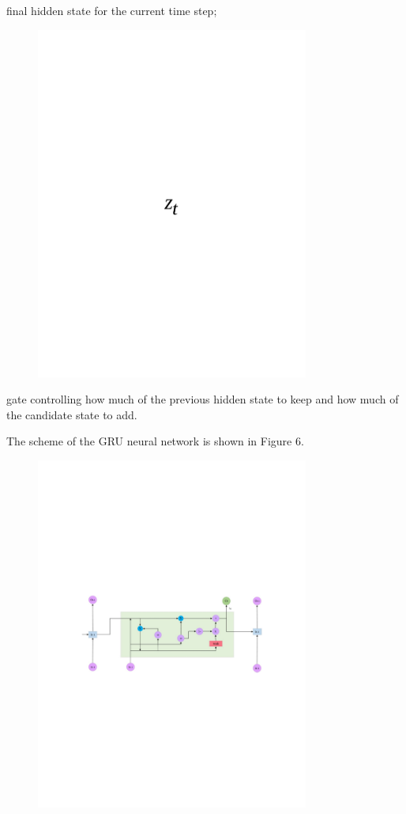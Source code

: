 final hidden state for the current time step;
\begin{figure}[H]
	\centering
	\includegraphics[width=0.8\textwidth]{media/ict/image78}
	\caption*{}
\end{figure}

gate controlling how much of the previous hidden state to keep and how
much of the candidate state to add.

The scheme of the GRU neural network is shown in Figure 6.

\begin{figure}[H]
	\centering
	\includegraphics[width=0.8\textwidth]{media/ict/image79}
	\caption*{}
\end{figure}


